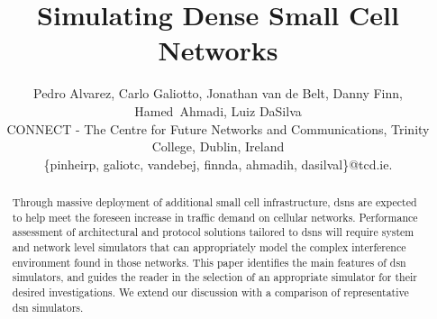 \documentclass[conference]{IEEEtran}
\begin{document}

\title{Simulating Dense Small Cell Networks}

\author{Pedro Alvarez, Carlo Galiotto, Jonathan van de Belt, Danny Finn, Hamed~Ahmadi, Luiz DaSilva\\
CONNECT - The Centre for Future Networks and Communications, Trinity College, Dublin, Ireland \\  \{pinheirp, galiotc, vandebej, finnda, ahmadih, dasilval\}@tcd.ie.
\vspace{-5mm}
}

\maketitle

\begin{abstract}

Through massive deployment of additional small cell infrastructure, \acp{dsn} are expected to help meet the foreseen
increase in traffic demand on cellular networks. Performance assessment of architectural and protocol solutions tailored to \acp{dsn} will
require system and network level simulators that can appropriately model the complex interference environment found in those networks. This
paper identifies the main features of \ac{dsn} simulators, and guides the reader in the selection of
an appropriate simulator for their desired investigations. We extend our discussion with a comparison of representative \ac{dsn} simulators. \vspace{-0.2cm}

\end{abstract}


\IEEEpeerreviewmaketitle
\end{document}
